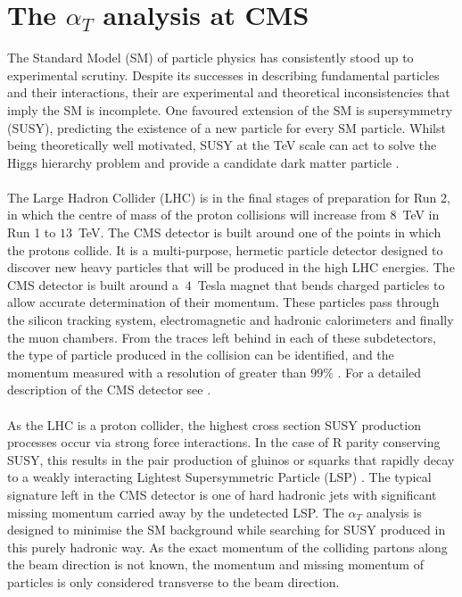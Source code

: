 
\section{The \boldmath $\alpha_T$ analysis at CMS}
\label{sec:Introduction}


The Standard Model (SM) of particle physics \cite{Salam1964}\cite{Glashow1961}\cite{Weinberg1967} has consistently stood up to experimental scrutiny. Despite its successes in describing fundamental particles and their interactions, their are experimental and theoretical inconsistencies that imply the SM is incomplete. One favoured extension of the SM is supersymmetry (SUSY), predicting the existence of a new particle for every SM particle. Whilst being theoretically well motivated, SUSY at the TeV scale can act to solve the Higgs hierarchy problem and provide a candidate dark matter particle \cite{SUSYprimerMartin:1997ns}\cite{more(See alphaT papter)}.
\\\\
The Large Hadron Collider (LHC) \cite{LHCMachine} is in the final stages of preparation for Run 2, in which the centre of mass of the proton collisions will increase from $8$~TeV in Run 1 to $13$~TeV. The CMS detector is built around one of the points in which the protons collide. It is a multi-purpose, hermetic particle detector designed to discover new heavy particles that will be produced in the high LHC energies. The CMS detector is built around a $~4$~Tesla magnet that bends charged particles to allow accurate determination of their momentum. These particles pass through the silicon tracking system, electromagnetic and hadronic calorimeters and finally the muon chambers. From the traces left behind in each of these subdetectors, the type of particle produced in the collision can be identified, and the momentum measured with a resolution of greater than $99\%$ \cite{ScienceArticle} \cite{CMSTechDesign1DetectorPerformance}. For a detailed description of the CMS detector see \cite{CMS_Overview_Chatrchyan:2008aa}.
\\\\
As the LHC is a proton collider, the highest cross section SUSY production processes occur via strong force interactions. In the case of R parity conserving SUSY, this results in the pair production of gluinos or squarks that rapidly decay to a weakly interacting Lightest Supersymmetric Particle (LSP) \cite{SUSYPhe_hadronic_states_Farrar:1978xj}. The typical signature left in the CMS detector is one of hard hadronic jets with significant missing momentum carried away by the undetected LSP. The $\alpha_T$ analysis is designed to minimise the SM background while searching for SUSY produced in this purely hadronic way. As the exact momentum of the colliding partons along the beam direction is not known, the momentum and missing momentum of particles is only considered transverse to the beam direction.

